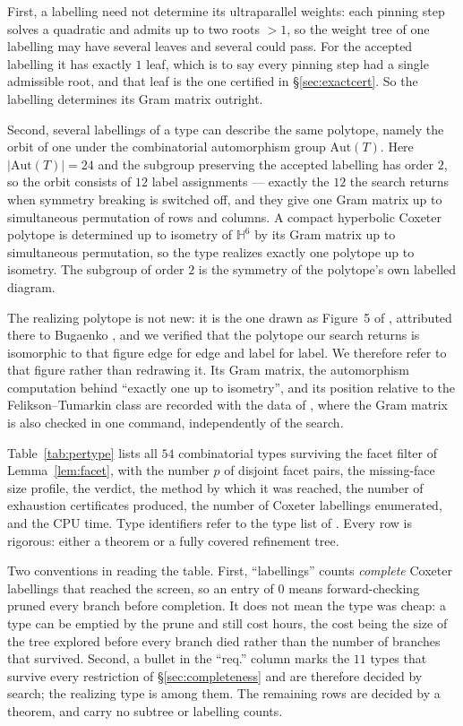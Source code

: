 \documentclass[11pt,reqno]{amsart}
\theoremstyle{plain}
\theoremstyle{definition}
\newcommand{\HH}{\mathbb{H}}
\newcommand{\NumSurvivors}{54}
\newcommand{\NumRequired}{11}
\newcommand{\NumGramConfigs}{12}
\newcommand{\AutTypeOrder}{24}
\newcommand{\AutStabOrder}{2}
\newcommand{\WeightLeaves}{1}
\begin{document}
First, a labelling need not determine its ultraparallel weights: each pinning step
solves a quadratic and admits up to two roots $>1$, so the weight tree of one
labelling may have several leaves and several could pass. For the accepted labelling
it has exactly $\WeightLeaves$ leaf, which is to say every pinning step had a single
admissible root, and that leaf is the one certified in \S\ref{sec:exactcert}. So the
labelling determines its Gram matrix outright.

Second, several labellings of a type can describe the same polytope, namely the
orbit of one under the combinatorial automorphism group $\mathrm{Aut}(T)$. Here
$|\mathrm{Aut}(T)|=\AutTypeOrder$ and the subgroup preserving the accepted labelling
has order $\AutStabOrder$, so the orbit consists of $\NumGramConfigs$ label
assignments --- exactly the $\NumGramConfigs$ the search returns when symmetry
breaking is switched off, and they give one Gram matrix up to simultaneous
permutation of rows and columns. A compact hyperbolic Coxeter polytope is determined
up to isometry of $\HH^6$ by its Gram matrix up to simultaneous permutation, so the
type realizes exactly one polytope up to isometry. The subgroup of order
$\AutStabOrder$ is the symmetry of the polytope's own labelled diagram.

The realizing polytope is not new: it is the one drawn as Figure~5 of
\cite{Burcroff2024}, attributed there to Bugaenko \cite{Bugaenko1984}, and we
verified that the polytope our search returns is isomorphic to that figure edge
for edge and label for label. We therefore refer to that figure rather than
redrawing it. Its Gram matrix, the automorphism computation behind ``exactly one
up to isometry'', and its position relative to the Felikson--Tumarkin class are
recorded with the data of \cite{Repo}, where the Gram matrix is also checked in
one command, independently of the search.

Table~\ref{tab:pertype} lists all $\NumSurvivors$ combinatorial types surviving
the facet filter of Lemma~\ref{lem:facet}, with the number $p$ of disjoint facet
pairs, the missing-face size profile, the verdict, the method by which it was
reached, the number of exhaustion certificates produced, the number of Coxeter
labellings enumerated, and the CPU time. Type identifiers refer to
the type list of \cite{Repo}. Every row is rigorous:
either a theorem or a fully covered refinement tree.

Two conventions in reading the table. First, ``labellings'' counts \emph{complete}
Coxeter labellings that reached the screen, so an entry of $0$ means
forward-checking pruned every branch before completion. It does not mean the type
was cheap: a type can be emptied by the prune and still cost hours, the cost being
the size of the tree explored before every branch died rather than the number of
branches that survived. Second, a bullet in the ``req.'' column marks the
$\NumRequired$ types that survive every restriction of \S\ref{sec:completeness} and
are therefore decided by search; the realizing type is among them. The remaining
rows are decided by a theorem, and carry no subtree or labelling counts.
\end{document}
